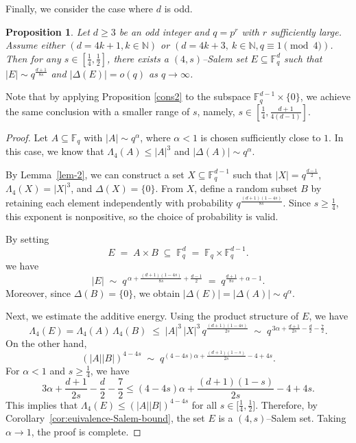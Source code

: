 \documentclass[11pt]{article}
\newtheorem{proposition}[theorem]{Proposition}
\begin{document}
Finally, we consider the case where $d$ is odd.
  \begin{proposition}\label{cons3}
	Let $d\ge3$ be an odd integer and $q = p^r$ with $r$ sufficiently large.  Assume either $(d=4k+1, k\in \mathbb{N})$ or $(d=4k+3, ~k\in \mathbb{N}, q\equiv 1\pmod 4)$. Then for any $s\in [\frac{1}{4},\frac{1}{2}]$, there exists a $(4, s)$--Salem set $E\subseteq\mathbb{F}_q^d$ such that 
    $|E|\sim q^{\frac{d+1}{8s}}$ and $|\Delta(E)| = o(q)$ as $q \to \infty$.
\end{proposition}
Note that by applying Proposition \ref{cons2} to the subspace $\mathbb{F}_q^{d-1}\times \{0\}$, we achieve the same conclusion with a smaller range of $s$, namely, $s\in [\frac{1}{4}, \frac{d+1}{4(d-1)}]$.
\begin{proof}
	Let $A\subseteq\mathbb{F}_q$ with $|A|\sim q^{\alpha}$, where $\alpha<1$ is chosen sufficiently close to $1$. In this case, we know that $\Lambda_4(A)\le|A|^3$ and $|\Delta(A)|\sim q^{\alpha}$. 
	
	By Lemma~\ref{lem-2}, we can construct a set $X \subseteq \mathbb{F}_q^{d-1}$ such that $|X| = q^{\frac{d-1}{2}}$, $\Lambda_4(X) = |X|^3$, and $\Delta(X) = \{0\}$. From $X$, define a random subset $B$ by retaining each element independently with probability $q^{\frac{(d+1)(1-4s)}{8s}}$. Since $s \ge \tfrac{1}{4}$, this exponent is nonpositive, so the choice of probability is valid.  
	
	By setting
	\[
	E \;=\; A \times B 
	\;\subseteq\; \mathbb{F}_{q}^{d}
	\;=\; \mathbb{F}_{q} \times \mathbb{F}_{q}^{d-1}.
	\]
    we have
	\[
	|E| \;\sim\; q^{\,\alpha + \frac{(d+1)(1-4s)}{8s} + \frac{d-1}{2}} 
	\;=\; q^{\frac{d+1}{8s}+\alpha-1}.
	\] 
	Moreover, since $\Delta(B) = \{0\}$, we obtain $|\Delta(E)| = |\Delta(A)|\sim q^\alpha$. 
	
	Next, we estimate the additive energy. Using the product structure of $E$, we have
	\[
	\Lambda_4(E) 
	= \Lambda_4(A)\,\Lambda_4(B) 
	\;\le\; |A|^3 \, |X|^3 \, q^{\frac{(d+1)(1-4s)}{2s}}
	\;\sim\; q^{\,3\alpha + \frac{d+1}{2s} - \frac{d}{2} - \frac{7}{2}}.
	\]
	On the other hand,
	\[
	(|A||B|)^{4-4s}
	\;\sim\; q^{(4-4s)\alpha+ \frac{(d+1)(1-s)}{2s} - 4 + 4s}.
	\]
	For $\alpha <1$ and $s \geq \frac{1}{4}$, we have 
    \[3\alpha + \frac{d+1}{2s} - \frac{d}{2} - \frac{7}{2}\leq (4-4s)\alpha+ \frac{(d+1)(1-s)}{2s} - 4 + 4s. \]
	This implies that $\Lambda_4(E) \le (|A||B|)^{4-4s}$ for all $s \in \big[\frac{1}{4}, \frac{1}{2}\big]$. Therefore, by Corollary~\ref{cor:euivalence-Salem-bound}, the set $E$ is a $(4,s)$--Salem set. Taking $\alpha\to 1$, the proof is complete. 
\end{proof}
\end{document}
